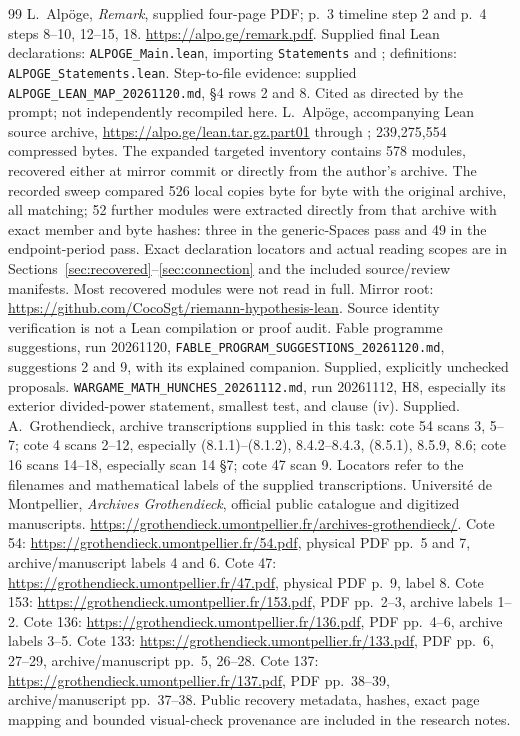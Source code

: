 \documentclass[11pt,a4paper]{article}
\theoremstyle{definition}\newtheorem{remark}[theorem]{Remark}
\begin{document}
\begin{thebibliography}{99}
 L.~Alp\"oge, \emph{Remark}, supplied four-page PDF; p.~3 timeline step 2 and p.~4 steps 8--10, 12--15, 18. \url{https://alpo.ge/remark.pdf}. Supplied final Lean declarations: \texttt{ALPOGE\_Main.lean}, importing \texttt{Statements} and ; definitions: \texttt{ALPOGE\_Statements.lean}. Step-to-file evidence: supplied \texttt{ALPOGE\_LEAN\_MAP\_20261120.md}, \S4 rows 2 and 8. Cited as directed by the prompt; not independently recompiled here.
 L.~Alp\"oge, accompanying Lean source archive, \url{https://alpo.ge/lean.tar.gz.part01} through ; 239,275,554 compressed bytes. The expanded targeted inventory contains 578 modules, recovered either at mirror commit  or directly from the author's archive. The recorded sweep compared 526 local copies byte for byte with the original archive, all matching; 52 further modules were extracted directly from that archive with exact member and byte hashes: three in the generic-Spaces pass and 49 in the endpoint-period pass. Exact declaration locators and actual reading scopes are in Sections~\ref{sec:recovered}--\ref{sec:connection} and the included source/review manifests. Most recovered modules were not read in full. Mirror root: \url{https://github.com/CocoSgt/riemann-hypothesis-lean}. Source identity verification is not a Lean compilation or proof audit.
 Fable programme suggestions, run 20261120, \texttt{FABLE\_PROGRAM\_SUGGESTIONS\_20261120.md}, suggestions 2 and 9, with its explained companion. Supplied, explicitly unchecked proposals.
 \texttt{WARGAME\_MATH\_HUNCHES\_20261112.md}, run 20261112, H8, especially its exterior divided-power statement, smallest test, and clause (iv). Supplied.
 A.~Grothendieck, archive transcriptions supplied in this task: cote 54 scans 3, 5--7; cote 4 scans 2--12, especially (8.1.1)--(8.1.2), 8.4.2--8.4.3, (8.5.1), 8.5.9, 8.6; cote 16 scans 14--18, especially scan 14 \S7; cote 47 scan 9. Locators refer to the filenames and mathematical labels of the supplied transcriptions.
 Universit\'e de Montpellier, \emph{Archives Grothendieck}, official public catalogue and digitized manuscripts. \url{https://grothendieck.umontpellier.fr/archives-grothendieck/}. Cote 54: \url{https://grothendieck.umontpellier.fr/54.pdf}, physical PDF pp.~5 and 7, archive/manuscript labels 4 and 6. Cote 47: \url{https://grothendieck.umontpellier.fr/47.pdf}, physical PDF p.~9, label 8. Cote 153: \url{https://grothendieck.umontpellier.fr/153.pdf}, PDF pp.~2--3, archive labels 1--2. Cote 136: \url{https://grothendieck.umontpellier.fr/136.pdf}, PDF pp.~4--6, archive labels 3--5. Cote 133: \url{https://grothendieck.umontpellier.fr/133.pdf}, PDF pp.~6, 27--29, archive/manuscript pp.~5, 26--28. Cote 137: \url{https://grothendieck.umontpellier.fr/137.pdf}, PDF pp.~38--39, archive/manuscript pp.~37--38. Public recovery metadata, hashes, exact page mapping and bounded visual-check provenance are included in the research notes.

\end{thebibliography}
\end{document}
